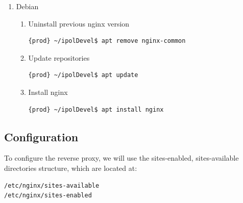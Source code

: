 \documentclass[a4paper,12pt]{article}
\begin{document}
\begin{enumerate}
\item Debian

\begin{enumerate}
    \item Uninstall previous nginx version
    \begin{lstlisting}[language=Bash]
	{prod} ~/ipolDevel$ apt remove nginx-common
    \end{lstlisting}

    \item Update repositories
    \begin{lstlisting}[language=Bash]
    {prod} ~/ipolDevel$ apt update
    \end{lstlisting}

    \item Install nginx
    \begin{lstlisting}[language=Bash]
    {prod} ~/ipolDevel$ apt install nginx
    \end{lstlisting}
    \end{enumerate}    
\end{enumerate}

\subsection{Configuration}

To configure the reverse proxy, we will use the sites-enabled, sites-available directories structure, which are located at:
\begin{lstlisting}[language=Bash]
/etc/nginx/sites-available
/etc/nginx/sites-enabled
\end{lstlisting}
\end{document}
